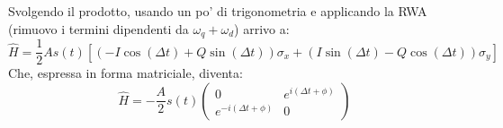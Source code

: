 Svolgendo il prodotto, usando un po' di trigonometria e applicando la RWA (rimuovo i termini dipendenti da $\omega_q + \omega_d$) arrivo a:
\begin{equation*}
    \hat H = \frac{1}{2}As(t) \left[ \left(-I \cos ( \Delta t) + Q \sin ( \Delta t) \right) \sigma_x + \left(I\sin ( \Delta t) - Q \cos ( \Delta t)  \right) \sigma_y \right] 
\end{equation*}
Che, espressa in forma matriciale, diventa:
\begin{equation*}
    \hat H = -\frac{A}{2}s(t) \begin{pmatrix} 0 & e^{i (\Delta t + \phi)} \\ e^{-i (\Delta t + \phi)} & 0 \end{pmatrix}
\end{equation*}